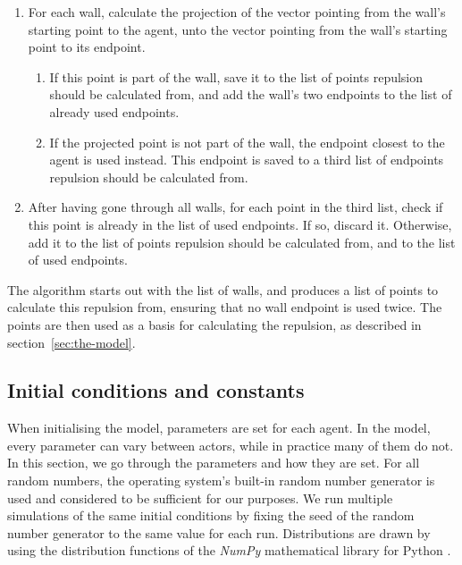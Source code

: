 \begin{enumerate}
    \item For each wall, calculate the projection of the vector pointing from 
        the wall's starting point to the agent, unto the vector pointing from 
        the wall's starting point to its endpoint.
        \begin{enumerate}
            \item If this point is part of the wall, save it to the list of points 
                repulsion should be calculated from, and add the wall's two endpoints 
                to the list of already used endpoints.

            \item If the projected point is not part of the wall, the endpoint closest 
                to the agent is used instead. This endpoint is saved to a 
                third list of endpoints repulsion should be calculated from.
        \end{enumerate}

    \item After having gone through all walls, for each point in the third 
        list, check if this point is already in the list of used endpoints. If 
        so, discard it. Otherwise, add it to the list of points repulsion 
        should be calculated from, and to the list of used endpoints.
\end{enumerate}

The algorithm starts out with the list of walls, and produces a list of points 
to calculate this repulsion from, ensuring that no wall endpoint is used 
twice. The points are then used as a basis for calculating the repulsion, as 
described in section~\ref{sec:the-model}.

\subsection{Initial conditions and constants}
When initialising the model, parameters are set for each agent. In the 
model, every parameter can vary between actors, while in practice many of them 
do not. In this section, we go through the parameters and how they are set.  
For all random numbers, the operating system's built-in random number 
generator is used and considered to be sufficient for our purposes. We run 
multiple simulations of the same initial conditions by fixing the seed of the 
random number generator to the same value for each run. Distributions are 
drawn by using the distribution functions of the \emph{NumPy} mathematical 
library for Python \cite{numpy}.

